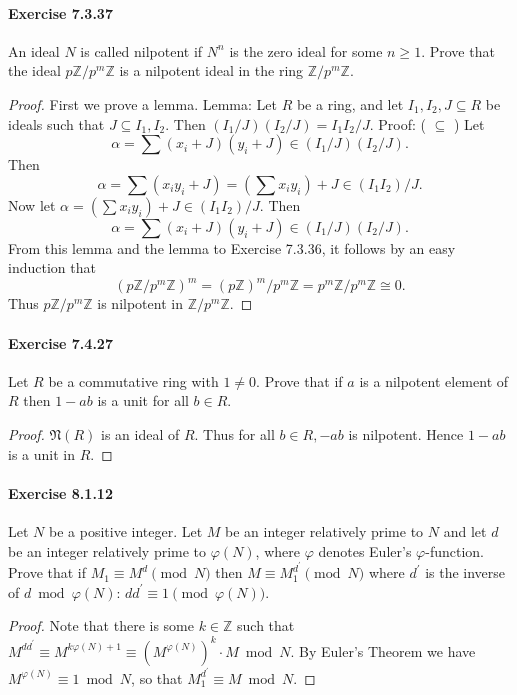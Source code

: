 \documentclass{article}
\theoremstyle{definition}
\begin{document}
\paragraph{Exercise 7.3.37} An ideal $N$ is called nilpotent if $N^{n}$ is the zero ideal for some $n \geq 1$. Prove that the ideal $p \mathbb{Z} / p^{m} \mathbb{Z}$ is a nilpotent ideal in the ring $\mathbb{Z} / p^{m} \mathbb{Z}$.
\begin{proof}
    First we prove a lemma.
Lemma: Let $R$ be a ring, and let $I_1, I_2, J \subseteq R$ be ideals such that $J \subseteq I_1, I_2$. Then $\left(I_1 / J\right)\left(I_2 / J\right)=I_1 I_2 / J$.
Proof: ( $\subseteq$ ) Let
$$
\alpha=\sum\left(x_i+J\right)\left(y_i+J\right) \in\left(I_1 / J\right)\left(I_2 / J\right) .
$$
Then
$$
\alpha=\sum\left(x_i y_i+J\right)=\left(\sum x_i y_i\right)+J \in\left(I_1 I_2\right) / J .
$$
Now let $\alpha=\left(\sum x_i y_i\right)+J \in\left(I_1 I_2\right) / J$. Then
$$
\alpha=\sum\left(x_i+J\right)\left(y_i+J\right) \in\left(I_1 / J\right)\left(I_2 / J\right) .
$$
From this lemma and the lemma to Exercise 7.3.36, it follows by an easy induction that
$$
\left(p \mathbb{Z} / p^m \mathbb{Z}\right)^m=(p \mathbb{Z})^m / p^m \mathbb{Z}=p^m \mathbb{Z} / p^m \mathbb{Z} \cong 0 .
$$
Thus $p \mathbb{Z} / p^m \mathbb{Z}$ is nilpotent in $\mathbb{Z} / p^m \mathbb{Z}$.
\end{proof}



\paragraph{Exercise 7.4.27} Let $R$ be a commutative ring with $1 \neq 0$. Prove that if $a$ is a nilpotent element of $R$ then $1-a b$ is a unit for all $b \in R$.
\begin{proof}
    $\mathfrak{N}(R)$ is an ideal of $R$. Thus for all $b \in R,-a b$ is nilpotent. Hence $1-a b$ is a unit in $R$.
\end{proof}



\paragraph{Exercise 8.1.12} Let $N$ be a positive integer. Let $M$ be an integer relatively prime to $N$ and let $d$ be an integer relatively prime to $\varphi(N)$, where $\varphi$ denotes Euler's $\varphi$-function. Prove that if $M_{1} \equiv M^{d} \pmod N$ then $M \equiv M_{1}^{d^{\prime}} \pmod N$ where $d^{\prime}$ is the inverse of $d \bmod \varphi(N)$: $d d^{\prime} \equiv 1 \pmod {\varphi(N)}$.
\begin{proof}
    Note that there is some $k \in \mathbb{Z}$ such that $M^{d d^{\prime}} \equiv M^{k \varphi(N)+1} \equiv\left(M^{\varphi(N)}\right)^k \cdot M \bmod N$. By Euler's Theorem we have $M^{\varphi(N)} \equiv 1 \bmod N$, so that $M_1^{d^{\prime}} \equiv M \bmod N$.
\end{proof}
\end{document}
